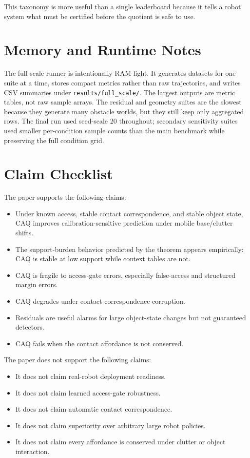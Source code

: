\documentclass{article}
\begin{document}
This taxonomy is more useful than a single leaderboard because it tells a robot system what must be certified before the quotient is safe to use.

\section{Memory and Runtime Notes}

The full-scale runner is intentionally RAM-light. It generates datasets for one suite at a time, stores compact metrics rather than raw trajectories, and writes CSV summaries under \texttt{results/full\_scale/}. The largest outputs are metric tables, not raw sample arrays. The residual and geometry suites are the slowest because they generate many obstacle worlds, but they still keep only aggregated rows. The final run used seed-scale 20 throughout; secondary sensitivity suites used smaller per-condition sample counts than the main benchmark while preserving the full condition grid.

\section{Claim Checklist}

The paper supports the following claims:

\begin{itemize}
    \item Under known access, stable contact correspondence, and stable object state, CAQ improves calibration-sensitive prediction under mobile base/clutter shifts.
    \item The support-burden behavior predicted by the theorem appears empirically: CAQ is stable at low support while context tables are not.
    \item CAQ is fragile to access-gate errors, especially false-access and structured margin errors.
    \item CAQ degrades under contact-correspondence corruption.
    \item Residuals are useful alarms for large object-state changes but not guaranteed detectors.
    \item CAQ fails when the contact affordance is not conserved.
\end{itemize}

The paper does not support the following claims:

\begin{itemize}
    \item It does not claim real-robot deployment readiness.
    \item It does not claim learned access-gate robustness.
    \item It does not claim automatic contact correspondence.
    \item It does not claim superiority over arbitrary large robot policies.
    \item It does not claim every affordance is conserved under clutter or object interaction.
\end{itemize}
\end{document}
